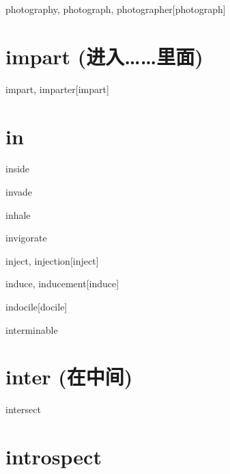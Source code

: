 \begin{RefWord}{photography, photograph, photographer}[photograph]
\end{RefWord}


\section{impart (进入……里面)}
\begin{RefWord}{impart, imparter}[impart]
\end{RefWord}

\section{in}

\begin{RefWord}{inside}
\end{RefWord}

\begin{RefWord}{invade}
\end{RefWord}

\begin{RefWord}{inhale}
\end{RefWord}

\begin{RefWord}{invigorate}
\end{RefWord}

\begin{RefWord}{inject, injection}[inject]
\end{RefWord}

\begin{RefWord}{induce, inducement}[induce]
\end{RefWord}

\begin{RefWord}{indocile}[docile]
\end{RefWord}

\begin{RefWord}{interminable}
\end{RefWord}

\section{inter (在中间)}

\begin{RefWord}{intersect}
\end{RefWord}

\section{introspect}

